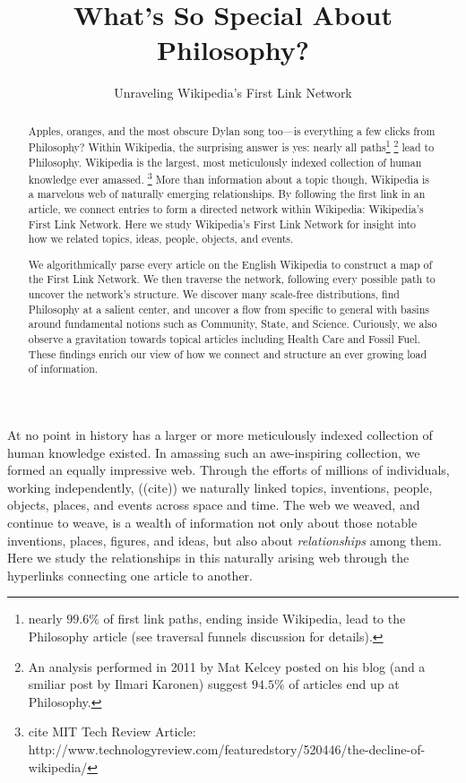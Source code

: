 \documentclass[twoside]{article}
\title{\vspace{-5mm}%
	\fontsize{24pt}{12pt}\selectfont
	\textbf{What's So Special About Philosophy?} 
	}
\author{%
\fontsize{14pt}{14pt}\selectfont
	Unraveling Wikipedia's First Link Network \vspace{-2mm}\\
	}
\date{}
\begin{document}
\maketitle
\thispagestyle{fancy}

\begin{abstract}
\fontsize{12pt}{12pt}
\selectfont

Apples, oranges, and the most obscure Dylan song too---is everything a few clicks from Philosophy? 
Within Wikipedia, the surprising answer is yes: nearly all 
paths\footnote{
nearly $99.6\%$ of first link paths, ending inside Wikipedia, lead to the Philosophy article (see traversal funnels discussion for details).}
\footnote{
An analysis performed in 2011 by Mat Kelcey posted on his blog (and a smiliar post by Ilmari Karonen) suggest $94.5\%$ of articles end up at Philosophy.
}
lead to Philosophy.
Wikipedia is the largest, most meticulously indexed collection of human knowledge ever amassed. 
\footnote{
cite MIT Tech Review Article: http://www.technologyreview.com/featuredstory/520446/the-decline-of-wikipedia/
}
More than information about a topic though, Wikipedia is a marvelous web of naturally emerging relationships.  
By following the first link in an article, we connect entries to form a directed network within Wikipedia: Wikipedia's First Link Network. 
Here we study Wikipedia's First Link Network for insight into how we related topics, ideas, people, objects, and events.  


We algorithmically parse every article on the English Wikipedia to construct a map of the First Link Network. 
We then traverse the network, following every possible path to uncover the network's structure.
We discover many scale-free distributions, find Philosophy at a salient center, and uncover a flow from specific to general with 
basins around fundamental notions such as Community, State, and Science. 
Curiously, we also observe a gravitation towards topical articles including Health Care and Fossil Fuel.
These findings enrich our view of how we connect and structure
an ever growing load of information.

\end{abstract}

\fontsize{11pt}{11pt}
\selectfont

At no point in history has a larger or more meticulously indexed collection of human knowledge existed.
In amassing such an awe-inspiring collection, we formed an equally impressive web. 
Through the efforts of millions of individuals, working independently,
((cite))
we naturally linked topics, inventions, people, objects, places, and events across space and time.
The web we weaved, and continue to weave, is a wealth of information not only about those notable inventions, 
places, figures, and ideas, but also about \textit{relationships} among them.
Here we study the relationships in this naturally arising web through the hyperlinks connecting one article to another.
\end{document}
